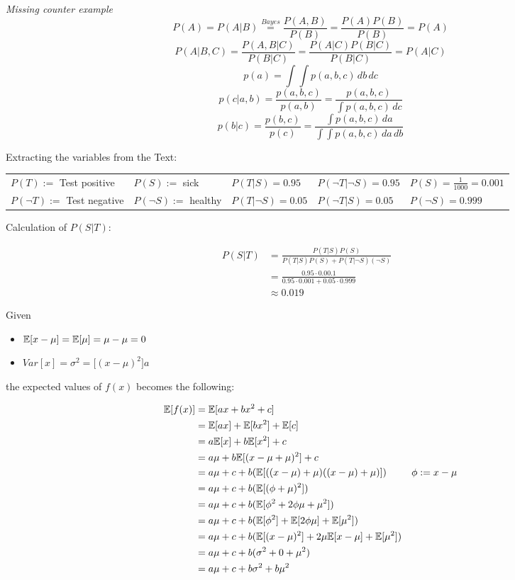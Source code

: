 %
\textit{Missing counter example}
%
\[ P(A) = P(A|B) \overset{Bayes}{=} \frac{P(A,B)}{P(B)} = \frac{P(A)P(B)}{P(B)} = P(A) \]
\[P(A|B,C) = \frac{P(A,B|C)}{P(B|C)} = \frac{P(A|C)P(B|C)}{P(B|C)} = P(A|C) \]
%
%
\[ p(a) = \int \int p(a,b,c)\,db\,dc \]
\[ p(c|a,b) = \frac{p(a,b,c)}{p(a,b)} = \frac{p(a,b,c)}{\int p(a,b,c)\, dc} \]
\[ p(b|c) = \frac{p(b,c)}{p(c)} = \frac{\int p(a,b,c) \, da}{\int \int p(a,b,c)\,da\,db} \]
%
%
\begin{flushleft}
Extracting the variables from the Text:
\end{flushleft}
\begin{table}[h]
\begin{tabular}{lllll}
  $P(T) :=$ Test positive & $P(S) :=$ sick & $P(T|S) = 0.95$ & $P(\neg T|\neg S) = 0.95$ & $P(S) = \frac{1}{1000} = 0.001$ \\
  $P(\neg T) :=$ Test negative & $P(\neg S) :=$ healthy & $P(T|\neg S) = 0.05$ & $P(\neg T|S) = 0.05$ & $P(\neg S) = 0.999$
\end{tabular}
\end{table}
\begin{flushleft}
Calculation of $P(S|T)$:
\end{flushleft}
\begin{align*}
  P(S|T) &= \frac{P(T|S)P(S)}{P(T|S)P(S) + P(T|\neg S)(\neg S)} &\\
  &= \frac{0.95 \cdot 0.00.1}{0.95 \cdot 0.001 + 0.05 \cdot 0.999} &\\
  &\approx 0.019 &
\end{align*}
%
%
\begin{flushleft}
Given
\begin{itemize}
  \item $\mathbb{E}[x-\mu] = \mathbb{E}[\mu] = \mu - \mu = 0$
  \item $Var[x] = \sigma^2 = \mathbb[(x-\mu)^2]a$
\end{itemize}
the expected values of $f(x)$ becomes the following:
\end{flushleft}
\begin{align}
  \mathbb{E}[f(x)] &= \mathbb{E}[ax + bx^2 + c] &\\
  &= \mathbb{E}[ax] + \mathbb{E}[bx^2] + \mathbb{E}[c] &\\
  &= a \mathbb{E}[x] + b \mathbb{E}[x^2] + c &\\
  &= a\mu + b \mathbb{E}[(x-\mu+\mu)^2] + c &\\
  &= a\mu + c + b(\mathbb{E}[((x-\mu) + \mu) ((x-\mu)+\mu)]) &\phi := x-\mu \\
  &= a\mu + c + b(\mathbb{E}[(\phi + \mu)^2]) \\
  &= a\mu + c + b(\mathbb{E}[\phi^2 + 2\phi\mu +\mu^2]) &\\
  &= a\mu + c + b(\mathbb{E}[\phi^2] + \mathbb{E}[2\phi\mu] + \mathbb{E}[\mu^2]) &\\
  &= a\mu + c + b(\mathbb{E}[(x-\mu)^2] + 2\mu \mathbb{E}[x-\mu] + \mathbb{E}[\mu^2]) &\\
  &= a\mu + c + b(\sigma^2 + 0 + \mu^2) &\\
  &= a\mu + c + b\sigma^2 + b\mu^2 &
\end{align}
